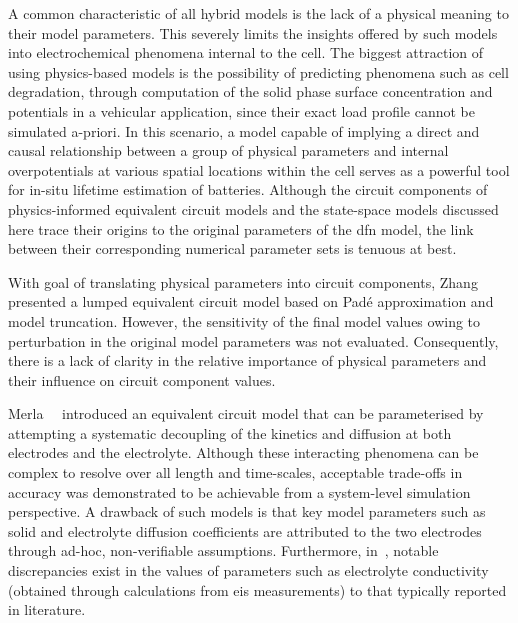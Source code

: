 A common characteristic of  all hybrid models is the lack  of a physical meaning
to their  model parameters. This  severely limits  the insights offered  by such
models  into  electrochemical  phenomena  internal  to  the  cell.  The  biggest
attraction  of  using physics-based  models  is  the possibility  of  predicting
phenomena such as cell degradation, \eg{} through computation of the solid phase
surface concentration  and potentials  in a  vehicular application,  since their
exact  load profile  cannot be  simulated a-priori.  In this  scenario, a  model
capable of implying a direct and causal relationship between a group of physical
parameters and internal  overpotentials at various spatial  locations within the
cell serves  as a powerful  tool for  in-situ lifetime estimation  of batteries.
Although the  circuit components  of physics-informed equivalent  circuit models
and the  state-space models discussed here  trace their origins to  the original
parameters of  the \gls{dfn}  model, the link between their corresponding
numerical parameter sets is tenuous at best.


With  goal   of  translating   physical  parameters  into   circuit  components,
Zhang~\etal{}~\cite{Zhang2017} presented a lumped equivalent circuit model based
on Padé  approximation and  model truncation. However,  the sensitivity  of the
final model  values owing to perturbation  in the original model  parameters was
not  evaluated.  Consequently, there  is  a  lack  of  clarity in  the  relative
importance  of physical  parameters  and their  influence  on circuit  component
values.


Merla~\etal{}~\cite{Merla2018} introduced  an equivalent circuit model  that can
be  parameterised by  attempting a  systematic  decoupling of  the kinetics  and
diffusion at  both electrodes  and the  electrolyte. Although  these interacting
phenomena can be complex to resolve  over all length and time-scales, acceptable
trade-offs in  accuracy was  demonstrated to be  achievable from  a system-level
simulation perspective. A  drawback of such models is that  key model parameters
such  as  solid  and  electrolyte   diffusion  coefficients  are  attributed  to
the  two electrodes  through  ad-hoc,  non-verifiable assumptions.  Furthermore,
in~\cite{Merla2018},  notable discrepancies  exist in  the values  of parameters
such as  electrolyte conductivity (obtained through  calculations from \gls{eis}
measurements) to  that typically reported  in literature. 


